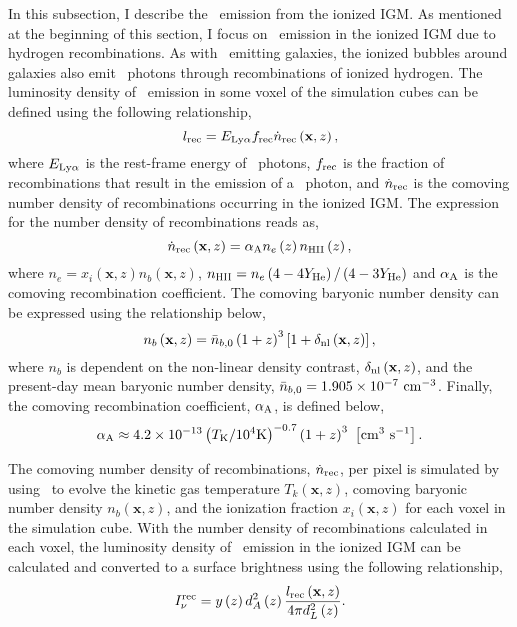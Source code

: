 \label{sec:ionized_igm}

In this subsection, I describe the \lya\ emission from the ionized IGM. As mentioned
at the beginning of this section, I focus on \lya\ emission in the ionized IGM due to hydrogen recombinations.
As with \lya\ emitting galaxies, the ionized bubbles around galaxies also emit \lya\ photons through
recombinations of ionized hydrogen. The luminosity density of \lya\ emission in
some voxel of the simulation cubes can be defined using the following relationship,
\begin{equation}
  l_{\rm rec} = E_{\rm Ly\alpha} f_{\rm rec} \dot{n}_{\rm rec} \left( \textbf{x}, z \right),
\end{equation}
where $E_{\rm Ly\alpha}$ is the rest-frame energy of \lya\ photons, $f_{\rm rec}$ is the
fraction of recombinations that result in the emission of a \lya\ photon, and $\dot{n}_{\rm rec}$
is the comoving number density of recombinations occurring in the ionized IGM. The expression for the
number density of recombinations reads as,
\begin{equation}
  \dot{n}_{\rm rec} \left( \textbf{x}, z \right) = \alpha_{\rm A} n_{e} \left(z \right) n_{\textsc{HII}} \left(z \right),
\end{equation}
where $n_{e} = x_i \left( \textbf{x}, z \right) n_{b} \left( \textbf{x}, z \right)$,
$n_{\textsc{HII}} = n_{e} \left(4 - 4 Y_{\rm He} \right) /  \left(4 - 3 Y_{\rm He} \right)$ and $\alpha_{\rm A}$
is the comoving recombination coefficient. The comoving baryonic number density can be expressed using the
relationship below,
\begin{equation}
  n_{b} \left( \textbf{x}, z \right) = \bar{n}_{b, 0} \left( 1 + z\right)^3 \left[1 + \delta_{\rm nl} \left( \textbf{x}, z\right) \right],
\end{equation}
where $n_{b}$ is dependent on the non-linear density contrast, $\delta_{\rm nl} \left( \textbf{x}, z\right)$, and the
present-day mean baryonic number density, $\bar{n}_{b, 0} = 1.905 \times 10^{-7} \ \rm{cm}^{-3}$. Finally, the
comoving recombination coefficient, $\alpha_{\rm A}$, is defined below,
\begin{equation}
  \alpha_{\rm A} \approx 4.2 \times 10^{-13} \left( T_{\rm K} / 10^4 {\rm K} \right)^{-0.7} \left( 1 + z\right)^3 \ \left[\rm  cm^3 \ s^{-1} \right].
\end{equation}

The comoving number density of recombinations, $\dot{n}_{\rm rec}$, per pixel is simulated
by using \fastsim\ to evolve the kinetic gas temperature $T_k \left( \textbf{x}, z \right)$,
comoving baryonic number density $n_{b} \left( \textbf{x}, z \right)$, and the ionization
fraction $x_{i} \left( \textbf{x}, z \right)$ for each voxel in the simulation cube.
With the number density of recombinations calculated in each voxel, the luminosity
density of \lya\ emission in the ionized IGM can be calculated and converted to
a surface brightness using the following relationship,
\begin{equation}
I_{\nu}^{\rm rec} = y \left(z \right) d_A^2 \left(z \right) \frac{l_{\rm rec} \left( \textbf{x}, z \right)}{4 \pi d_L^2 \left( z \right)}.
\end{equation}

